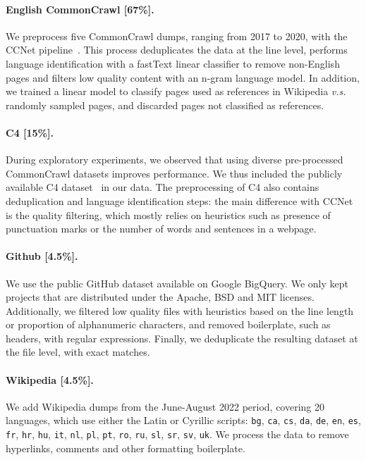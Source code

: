 \paragraph{English CommonCrawl [67\%].} 
We preprocess five CommonCrawl dumps, ranging from 2017 to 2020, with the CCNet pipeline~\cite{wenzek-etal-2020-ccnet}. This process deduplicates the data at the line level, performs language identification with a fastText linear classifier to remove non-English pages and filters low quality content with an n-gram language model. In addition, we trained a linear model to classify pages used as references in Wikipedia \emph{v.s.} randomly sampled pages, and discarded pages not classified as references.

\paragraph{C4 [15\%].}
During exploratory experiments, we observed that using diverse pre-processed CommonCrawl datasets improves performance. We thus included the publicly available C4 dataset~\citep{raffel2020exploring} in our data. The preprocessing of C4 also contains deduplication and language identification steps: the main difference with CCNet is the quality filtering, which mostly relies on heuristics such as presence of punctuation marks or the number of words and sentences in a webpage.

\paragraph{Github [4.5\%].}
We use the public GitHub dataset available on Google BigQuery. We only kept projects that are distributed under the Apache, BSD and MIT licenses. Additionally, we filtered low quality files with heuristics based on the line length or proportion of alphanumeric characters, and removed boilerplate, such as headers, with regular expressions. Finally, we deduplicate the resulting dataset at the file level, with exact matches.

\paragraph{Wikipedia [4.5\%].}
We add Wikipedia dumps from the June-August 2022 period, covering 20 languages, which use either the Latin or  Cyrillic scripts: \texttt{bg}, \texttt{ca}, \texttt{cs}, \texttt{da}, \texttt{de}, \texttt{en}, \texttt{es}, \texttt{fr}, \texttt{hr}, \texttt{hu}, \texttt{it}, \texttt{nl}, \texttt{pl}, \texttt{pt}, \texttt{ro}, \texttt{ru}, \texttt{sl}, \texttt{sr}, \texttt{sv}, \texttt{uk}.
We process the data to remove hyperlinks, comments and other formatting boilerplate.

